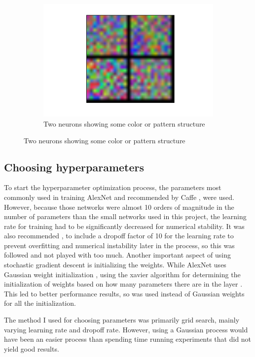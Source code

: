 \documentclass[10pt]{article}
\begin{document}
\begin{figure}[!ht]
\begin{subfigure}[t]{0.288\textwidth}
	\includegraphics[width=\textwidth]{neuron_color_structure.pdf}
	\caption{Two neurons showing some color or pattern structure}
	\label{fig:someneuronstructure}
\end{subfigure}
\end{figure}

\subsection{Choosing hyperparameters}

To start the hyperparameter optimization process, the parameters most commonly used in training AlexNet and recommended by Caffe \cite{jia_caffe:_2014}, \cite{krizhevsky_imagenet_2012} were used. However, because those networks were almost 10 orders of magnitude in the number of parameters than the small networks used in this project, the learning rate for training had to be significantly decreased for numerical stability. It was also recommended \cite{bottou_large-scale_2010}, \cite{agrawal_analyzing_2014} to include a dropoff factor of 10 for the learning rate to prevent overfitting and numerical instability later in the process, so this was followed and not played with too much. Another important aspect of using stochastic gradient descent is initializing the weights. While AlexNet uses Gaussian weight initialization \cite{krizhevsky_imagenet_2012}, using the xavier algorithm for determining the initialization of weights based on how many parameters there are in the layer \cite{glorot_understanding_2010}. This led to better performance results, so was used instead of Gaussian weights for all the initialization.

The method I used for choosing parameters was primarily grid search, mainly varying learning rate and dropoff rate. However, using a Gaussian process would have been an easier process than spending time running experiments that did not yield good results. 
\end{document}

